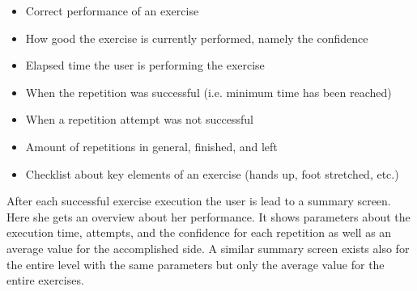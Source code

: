 \begin{itemize}
\item Correct performance of an exercise
\item How good the exercise is currently performed, namely the confidence
\item Elapsed time the user is performing the exercise
\item When the repetition was successful (i.e. minimum time has been reached)
\item When a repetition attempt was not successful
\item Amount of repetitions in general, finished, and left
\item Checklist about key elements of an exercise (hands up, foot stretched, etc.)
\end{itemize}

After each successful exercise execution the user is lead to a summary screen. Here she gets an overview about her performance. It shows parameters about the execution time, attempts, and the confidence for each repetition as well as an average value for the accomplished side. A similar summary screen exists also for the entire level with the same parameters but only the average value for the entire exercises.

